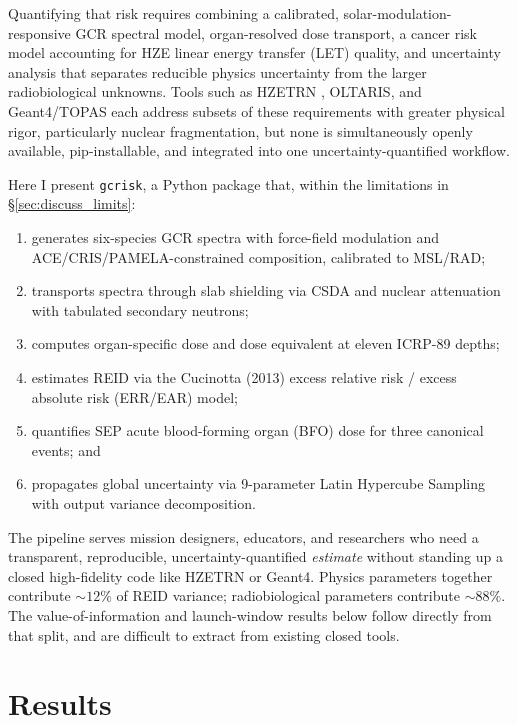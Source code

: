 \documentclass[a4paper,fleqn]{cas-dc}
\newcommand{\code}[1]{\texttt{#1}}
\begin{document}
Quantifying that risk requires combining
a calibrated, solar-modulation-responsive GCR spectral model, organ-resolved
dose transport, a cancer risk model accounting for HZE linear energy
transfer (LET) quality, and
uncertainty analysis that separates reducible physics uncertainty from the
larger radiobiological unknowns.
Tools such as HZETRN \citep{wilson1991}, OLTARIS, and Geant4/TOPAS each
address subsets of these requirements with greater physical rigor,
particularly nuclear fragmentation, but none is simultaneously openly
available, pip-installable, and integrated into one
uncertainty-quantified workflow.

Here I present \code{gcrisk}, a Python package that, within the
limitations in \S\ref{sec:discuss_limits}:
\begin{enumerate}
  \item generates six-species GCR spectra with force-field modulation and
        ACE/CRIS/PAMELA-constrained composition, calibrated to MSL/RAD;
  \item transports spectra through slab shielding via CSDA and nuclear
        attenuation with tabulated secondary neutrons;
  \item computes organ-specific dose and dose equivalent at eleven
        ICRP-89 depths;
  \item estimates REID via the Cucinotta (2013) excess relative risk /
        excess absolute risk (ERR/EAR) model;
  \item quantifies SEP acute blood-forming organ (BFO) dose for three
        canonical events; and
  \item propagates global uncertainty via 9-parameter Latin Hypercube
        Sampling with output variance decomposition.
\end{enumerate}

The pipeline serves mission designers, educators, and
researchers who need a transparent, reproducible, uncertainty-quantified
\emph{estimate} without standing up a closed high-fidelity code like HZETRN
or Geant4. Physics parameters together contribute $\sim\!12\%$ of
REID variance; radiobiological parameters contribute $\sim\!88\%$. The
value-of-information and launch-window results below follow directly from
that split, and are difficult to extract from existing closed tools.



\section{Results}
\label{sec:results}
\end{document}
